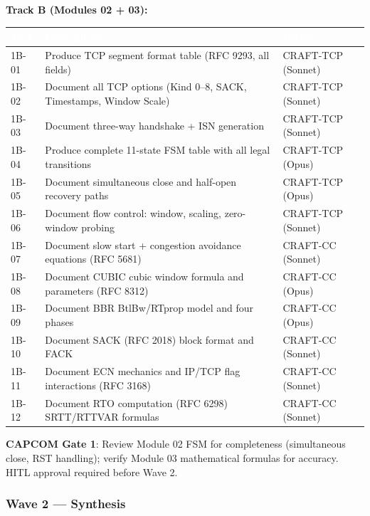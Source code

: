 \documentclass[11pt,letterpaper]{article}
\newcommand{\tableheader}[1]{\textbf{\sffamily\textcolor{white}{#1}}}
\begin{document}
\textbf{Track B (Modules 02 + 03):}

\begin{center}
\begin{tabularx}{\textwidth}{L{2.5cm}XC{2cm}}
\toprule
{}
\tableheader{Task} & \tableheader{Description} & \tableheader{Owner} \\
\midrule
1B-01 & Produce TCP segment format table (RFC 9293, all fields) & CRAFT-TCP (Sonnet) \\
1B-02 & Document all TCP options (Kind 0--8, SACK, Timestamps, Window Scale) & CRAFT-TCP (Sonnet) \\
1B-03 & Document three-way handshake + ISN generation & CRAFT-TCP (Sonnet) \\
1B-04 & Produce complete 11-state FSM table with all legal transitions & CRAFT-TCP (Opus) \\
1B-05 & Document simultaneous close and half-open recovery paths & CRAFT-TCP (Opus) \\
1B-06 & Document flow control: window, scaling, zero-window probing & CRAFT-TCP (Sonnet) \\
1B-07 & Document slow start + congestion avoidance equations (RFC 5681) & CRAFT-CC (Sonnet) \\
1B-08 & Document CUBIC cubic window formula and parameters (RFC 8312) & CRAFT-CC (Opus) \\
1B-09 & Document BBR BtlBw/RTprop model and four phases & CRAFT-CC (Opus) \\
1B-10 & Document SACK (RFC 2018) block format and FACK & CRAFT-CC (Sonnet) \\
1B-11 & Document ECN mechanics and IP/TCP flag interactions (RFC 3168) & CRAFT-CC (Sonnet) \\
1B-12 & Document RTO computation (RFC 6298) SRTT/RTTVAR formulas & CRAFT-CC (Sonnet) \\
\bottomrule
\end{tabularx}
\end{center}

\textbf{CAPCOM Gate 1}: Review Module 02 FSM for completeness (simultaneous close, RST handling); verify Module 03 mathematical formulas for accuracy. HITL approval required before Wave 2.

\subsubsection{Wave 2 --- Synthesis}
\end{document}
